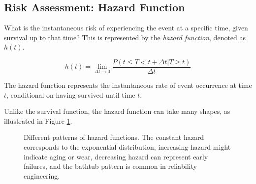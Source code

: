 \subsection{Risk Assessment: Hazard Function}

What is the instantaneous risk of experiencing the event at a specific time, given survival up to that time? This is represented by the \textit{hazard function}, denoted as $h(t)$.

\begin{equationbox}[title=Hazard Function]
\begin{equation}
h(t) = \lim_{\Delta t \to 0} \frac{P(t \leq T < t + \Delta t | T \geq t)}{\Delta t}
\end{equation}

The hazard function represents the instantaneous rate of event occurrence at time $t$, conditional on having survived until time $t$.
\end{equationbox}

Unlike the survival function, the hazard function can take many shapes, as illustrated in Figure \ref{fig:hazard-patterns}.

\begin{figure}[htbp]
    \centering
    \caption{Different patterns of hazard functions. The constant hazard corresponds to the exponential distribution, increasing hazard might indicate aging or wear, decreasing hazard can represent early failures, and the bathtub pattern is common in reliability engineering.}
    \label{fig:hazard-patterns}
\end{figure}

